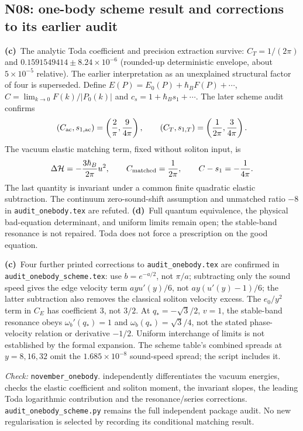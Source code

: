 \documentclass[11pt,a4paper]{article}
\newcommand{\C}{\textbf{(c)}\ }
\newcommand{\D}{\textbf{(d)}\ }
\newcommand{\file}[1]{\nolinkurl{#1}}
\newcommand{\test}[1]{\textit{Check:} \file{#1}.}
\begin{document}
\subsection{N08: one-body scheme result and corrections to its earlier audit}
\C The analytic Toda coefficient and precision extraction survive:
$C_T=1/(2\pi)$ and $0.1591549414\pm8.24\times10^{-6}$ (rounded-up deterministic
envelope, about $5\times10^{-5}$ relative). The earlier interpretation as an
unexplained structural factor of four is superseded. Define
$E(P)=E_0(P)+\hbar_BF(P)+\cdots$, $C=\lim_{k\to0}F(k)/|P_0(k)|$ and
$c_s=1+\hbar_Bs_1+\cdots$. The later scheme audit confirms
\[
 (C_{\rm ac},s_{1,\rm ac})=\left(\frac2\pi,\frac9{4\pi}\right),\qquad
 (C_T,s_{1,T})=\left(\frac1{2\pi},\frac3{4\pi}\right).
\]
The vacuum elastic matching term, fixed without soliton input, is
\[
 \Delta\mathcal H=-\frac{3\hbar_B}{2\pi}u^2,
 \qquad C_{\rm matched}=\frac1{2\pi},\qquad C-s_1=-\frac1{4\pi}.
\]
The last quantity is invariant under a common finite quadratic elastic
subtraction. The continuum zero-sound-shift assumption and unmatched ratio
$-8$ in \file{audit_onebody.tex} are refuted. \D Full quantum equivalence,
the physical bad-equation determinant, and uniform limits remain open; the
stable-band resonance is not repaired. Toda does not force a prescription on
the good equation.

\C Four further printed corrections to \file{audit_onebody.tex} are confirmed
in \file{audit_onebody_scheme.tex}: use $b=e^{-a/2}$, not $\pi/a$;
subtracting only the sound speed gives the edge velocity term
$ay u'(y)/6$, not $ay(u'(y)-1)/6$; the latter subtraction also removes the
classical soliton velocity excess. The $e_0/y^2$ term in $C_E$ has coefficient
$3$, not $3/2$. At $q_*=-\sqrt3/2$, $v=1$, the stable-band resonance obeys
$\omega_b'(q_*)=1$ and $\omega_b(q_*)=\sqrt3/4$, not the stated phase-velocity
relation or derivative $-1/2$. Uniform interchange of limits is not established
by the formal expansion. The scheme table's combined spreads at $y=8,16,32$
omit the $1.685\times10^{-8}$ sound-speed spread; the script includes it.

\test{november_onebody} independently differentiates the vacuum energies,
checks the elastic coefficient and soliton moment, the invariant slopes,
the leading Toda logarithmic contribution and the resonance/series corrections.
\file{audit_onebody_scheme.py} remains the full independent package audit.
No new regularisation is selected by recording its conditional matching result.
\end{document}
